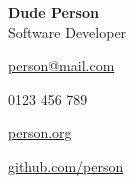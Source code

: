 \begin{multicols}{2}
\begin{flushright}
    {\Huge \bfseries Dude Person}\\
	Software Developer

	\columnbreak
\end{flushright}
\par

\icemail \large{\href{mailto:person@mail.com}{person@mail.com}}

\icphone \large{0123 456 789}

\icwebsite \large{\href{https://person.org}{person.org}}\

\icgithub \large{\href{https://github.com/person}{github.com/person}}

\end{multicols}
